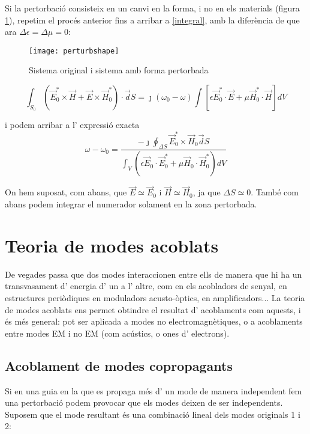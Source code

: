 Si la pertorbació consisteix en un canvi en la forma, i no en els materials (figura \cref{perturbshape}), repetim el procés anterior fins a arribar a \cref{integral}, amb la diferència de que ara $\Delta \epsilon = \Delta \mu = 0$:

\begin{figure}[ht]
  \centering
  \texttt{[image: perturbshape]}
  \caption{Sistema original i sistema amb forma pertorbada}
  \label{perturbshape}
\end{figure}

\begin{equation}
  \int _{S_0}  (\vec E_0 ^* \times \vec H + \vec E \times \vec H_0 ^*) \cdot \vec dS = \jmath ( \omega_0 - \omega) \int \left [  \epsilon \vec E_0 ^* \cdot \vec E + \mu \vec H_0 ^* \cdot \vec H \right ] dV
\end{equation}

i podem arribar a l' expressió exacta 
\begin{equation}
  \omega - \omega_0 = \frac{- \jmath \oint _{\Delta S} \vec E_0 ^* \times \vec H_0 \vec dS}{\int _V (\epsilon \vec E_0 \cdot \vec E_0 ^* + \mu \vec H_0 \cdot \vec H_0^*) dV}
\end{equation}

On hem suposat, com abans, que $\vec E \simeq \vec E_0$ i $\vec H \simeq \vec H_0$, ja que $\Delta S \simeq 0$. També com abans podem integrar el numerador solament en la zona pertorbada.

\section{Teoria de modes acoblats}

De vegades passa que dos modes interaccionen entre ells de manera que hi ha un transvasament d' energia d' un a l' altre, com en els acobladors de senyal, en estructures periòdiques en moduladors acusto-òptics, en amplificadors... La teoria de modes acoblats ens permet obtindre el resultat d' acoblaments com aquests, i és més general: pot ser aplicada a modes no electromagnètiques, o a acoblaments entre modes EM i no EM (com acústics, o ones d' electrons).

\subsection{Acoblament de modes copropagants}

Si en una guia en la que es propaga més d' un mode de manera independent fem una pertorbació podem provocar que els modes deixen de ser independents. Suposem que el mode resultant és una combinació lineal dels modes originals 1 i 2:

